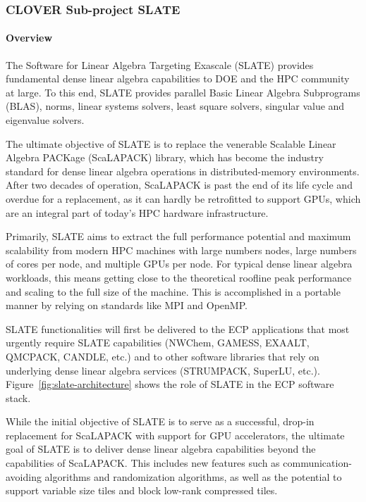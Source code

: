 \subsubsection{ CLOVER Sub-project SLATE}\label{subsubsect:slate}

\paragraph{Overview}

The Software for Linear Algebra Targeting Exascale (SLATE)
provides fundamental dense linear algebra capabilities
to DOE and the HPC community at large.
To this end, SLATE provides
parallel Basic Linear Algebra Subprograms (BLAS), norms,
linear systems solvers, least square solvers,
singular value and eigenvalue solvers.

The ultimate objective of SLATE is to replace the
venerable Scalable Linear Algebra PACKage (ScaLAPACK) library,
which has become the industry standard for dense linear algebra operations
in distributed-memory environments.
After two decades of operation,
ScaLAPACK is past the end of its life cycle and overdue for a replacement,
as it can hardly be retrofitted to support GPUs,
which are an integral part of today's HPC hardware infrastructure.

Primarily, SLATE aims to extract the full performance potential and maximum
scalability from modern HPC machines with large numbers nodes,
large numbers of cores per node, and multiple GPUs per node.
For typical dense linear algebra workloads, this means getting close
to the theoretical roofline peak performance and scaling to the full size of
the machine.
This is accomplished in a portable manner by relying on standards
like MPI and OpenMP.

SLATE functionalities will first be delivered to the ECP applications
that most urgently require SLATE capabilities
(NWChem, GAMESS, EXAALT, QMCPACK, CANDLE, etc.)
and to other software libraries
that rely on underlying dense linear algebra services
(STRUMPACK, SuperLU, etc.).
Figure~\ref{fig:slate-architecture} shows the role of SLATE
in the ECP software stack.

While the initial objective of SLATE is to serve as a successful,
drop-in replacement for ScaLAPACK with support for GPU accelerators,
the ultimate goal of SLATE is to deliver dense linear algebra capabilities
beyond the capabilities of ScaLAPACK.
This includes new features such as communication-avoiding
algorithms and randomization algorithms, as well as the potential to
support variable size tiles and block low-rank compressed tiles.

